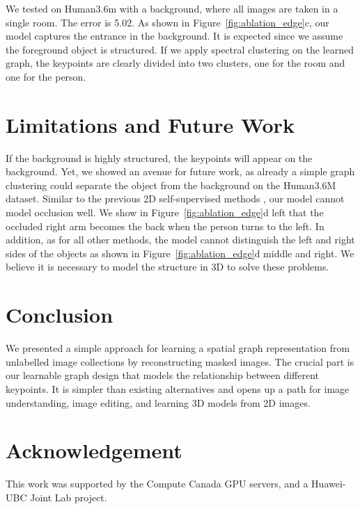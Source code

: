\documentclass{article}
\begin{document}
 We tested on Human3.6m with a background, where all images are taken in a single room. The error is 5.02. As shown in Figure~\ref{fig:ablation_edge}c, our model captures the entrance in the background. It is expected since we assume the foreground object is structured. If we apply spectral clustering \cite{ng2001spectral} on the learned graph, the keypoints are clearly divided into two clusters, one for the room and one for the person. \section{Limitations and Future Work} \label{sec:limitation}
If the background is highly structured, the keypoints will appear on the background. Yet, 
we showed an avenue for future work, as already a simple 
graph clustering could separate the object from the background on the Human3.6M dataset. Similar to the previous 2D self-supervised methods \cite{lorenz2019unsupervised, siarohin2021motion, he2022ganseg}, our model cannot model occlusion well. We show in Figure~\ref{fig:ablation_edge}d left that the occluded right arm becomes the back when the person turns to the left. In addition, as for all other methods, the model cannot distinguish the left and right sides of the objects as shown in Figure~\ref{fig:ablation_edge}d middle and right. We believe it is necessary to model the structure in 3D to solve these problems.



\section{Conclusion}

We presented a simple approach for learning a spatial graph representation from unlabelled image collections by reconstructing masked images. The crucial part is our learnable graph design that models the relationship between different keypoints. 
It is simpler than existing alternatives 
and opens up a path for image understanding, image editing, and learning 3D models from 2D images. 
\section*{Acknowledgement}
This work was supported by the Compute Canada GPU servers, and a Huawei-UBC Joint Lab project.



\end{document}
